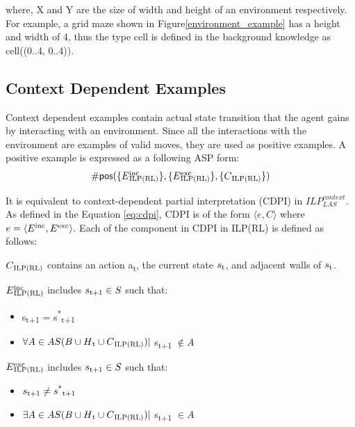 where, \textsf{X} and \textsf{Y} are the size of width and height of an environment respectively. 
For example, a grid maze shown in Figure\ref{environment_example} has a height and width of 4, thus the type cell is defined in the background knowledge as \textsf{cell((0..4, 0..4))}.

\subsection{Context Dependent Examples}
\label{subsec:context_dependent_examples}
Context dependent examples contain actual state transition that the agent gains by interacting with an environment. Since all the interactions with the environment are examples of valid moves,
they are used as positive examples. A positive example is expressed as a following ASP form:
\begin{equation}
\begin{split}
    \textsf{\#pos}(\{E\SPSB{inc}{ILP(RL)}\}, \{E\SPSB{exc}{ILP(RL)}\}, \{C\textsubscript{ILP(RL)}\})
\end{split}
\end{equation}

It is equivalent to context-dependent partial interpretation (CDPI) in  $ILP_{LAS}^{context}$. 
As defined in the Equation \ref{eq:cdpi}, CDPI is of the form $\langle e, C \rangle$ where $e = \langle E\textsuperscript{inc}, E\textsuperscript{exc} \rangle$. 
Each of the component in CDPI in ILP(RL) is defined as follows:

\begin{defn}\label{def:ILPRL_context}
$C\textsubscript{ILP(RL)}$ contains an action a\textsubscript{t}, the current state $s\textsubscript{t}$, and adjacent walls of $s\textsubscript{t}$.
\label{def:context}
\end{defn}

\begin{defn} \label{def:ILPRL_inc}
$E\SPSB{inc}{ILP(RL)}$ includes $s\textsubscript{t+1} \in S$ such that:
\begin{itemize}
\item s\textsubscript{t+1} = s\textsuperscript{*}\textsubscript{t+1}
\item $ \forall A \in AS(B \cup H\textsubscript{t} \cup C\textsubscript{ILP(RL)})|$ s\textsubscript{t+1} $\not\in A$
\end{itemize}
\end{defn}

\begin{defn} \label{def:ILPRL_exc}
$E\SPSB{exc}{ILP(RL)}$ includes $s\textsubscript{t+1} \in S$ such that:
\begin{itemize}
\item $s\textsubscript{t+1} \neq s\textsuperscript{*}\textsubscript{t+1}$
\item $ \exists A \in AS(B \cup H\textsubscript{t} \cup C\textsubscript{ILP(RL)})|$ s\textsubscript{t+1} $\in A$
\end{itemize}
\end{defn}

